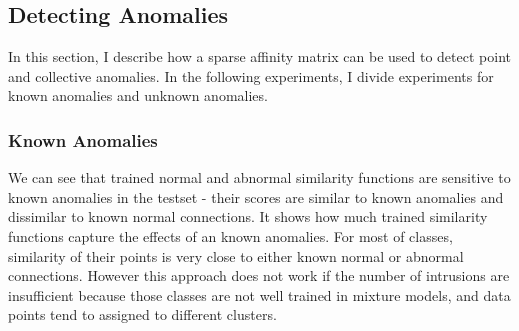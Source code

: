 
\subsection{Detecting Anomalies}
\label{subsec:detectinganomalies}
In this section, I describe how a sparse affinity matrix can be used to detect point and collective anomalies. 
In the following experiments, I divide experiments for known anomalies and unknown anomalies. 

\subsubsection{Known Anomalies}
We can see that trained normal and abnormal similarity functions are sensitive to known anomalies in the testset - their scores are similar to known anomalies and dissimilar to known normal connections. 
It shows how much trained similarity functions capture the effects of an known anomalies. 
For most of classes, similarity of their points is very close to either known normal or abnormal connections. 
However this approach does not work if the number of intrusions are insufficient because those classes are not well trained in mixture models, and data points tend to assigned to different clusters. 


